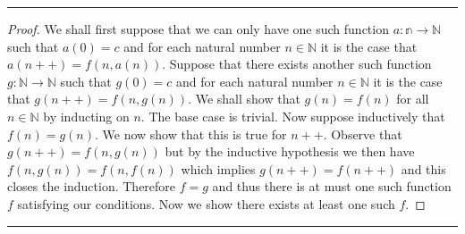 \documentclass{article}
\newcommand{\lined}{\noindent\rule{\textwidth}{1pt}}
\begin{document}
	\lined
	\begin{proof}
		We shall first suppose that we can only have one such function $a:\mathbb{n} \rightarrow \mathbb{N}$ such that $a(0) = c$ and for each natural number $n \in \mathbb{N}$ it is the case that $a(n++) = f(n,a(n))$. Suppose that there exists another such function $g:\mathbb{N} \rightarrow \mathbb{N}$ such that $g(0) = c$ and for each natural number $n \in \mathbb{N}$ it is the case that $g(n++) = f(n,g(n))$. We shall show that $g(n) = f(n)$ for all $n \in \mathbb{N}$ by inducting on $n$. The base case is trivial. Now suppose inductively that $f(n) = g(n)$. We now show that this is true for $n++$. Observe that $g(n++) = f(n,g(n))$ but by the inductive hypothesis we then have $f(n,g(n)) = f(n,f(n))$ which implies $g(n++) = f(n++)$ and this closes the induction. Therefore $f = g$ and thus there is at must one such function $f$ satisfying our conditions. Now we show there exists at least one such $f$. 
	\end{proof}
	
	\lined
	
	
	
\end{document}
